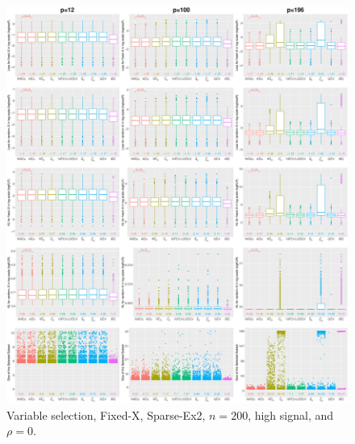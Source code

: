 \begin{figure}[!ht]
\centering
\includegraphics[width=\textwidth]{figures/supplement/fixedx/subset_selection/Sparse-Ex2_n200_hsnr_rho0.eps}
\caption{Variable selection, Fixed-X, Sparse-Ex2, $n=200$, high signal, and $\rho=0$.}
\end{figure}
\clearpage
